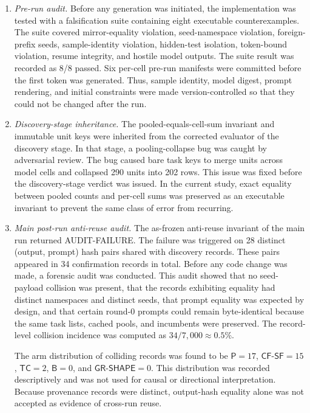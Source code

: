\documentclass{article}
\numberwithin{equation}{section}  %
\theoremstyle{definition}
\newcommand{\armP}{\textsf{P}}
\newcommand{\armB}{\textsf{B}}
\newcommand{\armTC}{\textsf{TC}}
\newcommand{\armCF}{\textsf{CF-SF}}
\newcommand{\armGR}{\textsf{GR-SHAPE}}
\begin{document}
\begin{enumerate}[label=(\roman*),leftmargin=2em]

\item \emph{Pre-run audit.}
Before any generation was initiated, the implementation was tested with a falsification suite
containing eight executable counterexamples. The suite covered mirror-equality violation,
seed-namespace violation, foreign-prefix seeds, sample-identity violation, hidden-test
isolation, token-bound violation, resume integrity, and hostile model outputs. The suite
result was recorded as 8/8 passed. Six per-cell pre-run manifests were committed before the
first token was generated. Thus, sample identity, model digest, prompt rendering, and initial
constraints were made version-controlled so that they could not be changed after the run.

\item \emph{Discovery-stage inheritance.}
The pooled-equals-cell-sum invariant and immutable unit keys were inherited from the corrected
evaluator of the discovery stage. In that stage, a pooling-collapse bug was caught by
adversarial review. The bug caused bare task keys to merge units across model cells and
collapsed 290 units into 202 rows. This issue was fixed before the discovery-stage verdict was
issued. In the current study, exact equality between pooled counts and per-cell sums was
preserved as an executable invariant to prevent the same class of error from recurring.

\item \emph{Main post-run anti-reuse audit.}
The as-frozen anti-reuse invariant of the main run returned AUDIT-FAILURE. The failure was
triggered on 28 distinct (output, prompt) hash pairs shared with discovery records. These
pairs appeared in 34 confirmation records in total. Before any code change was made, a
forensic audit was conducted. This audit showed that no seed-payload collision was present,
that the records exhibiting equality had distinct namespaces and distinct seeds, that prompt
equality was expected by design, and that certain round-0 prompts could remain byte-identical
because the same task lists, cached pools, and incumbents were preserved. The record-level
collision incidence was computed as $34/7{,}000 \approx 0.5\%$.

The arm distribution of colliding records was found to be $\armP=17$, $\armCF=15$,
$\armTC=2$, $\armB=0$, and $\armGR=0$. This distribution was recorded descriptively and was
not used for causal or directional interpretation. Because provenance records were distinct,
output-hash equality alone was not accepted as evidence of cross-run reuse.


\end{enumerate}
\end{document}
